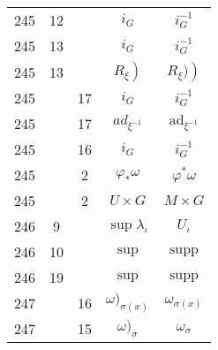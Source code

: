 \documentclass[a4paper,11pt]{article}
\newcommand{\mr}{\mathrm}
\newcommand{\ti}{\times}
\newcommand{\ad}{\mr{ad}}
\newcommand{\supp}{\mr{supp}}
\newcommand{\vp}{\varphi}
\newcommand{\io}{\iota}
\newcommand{\la}{\lambda}
\newcommand{\om}{\omega}
\newcommand{\s}{\sigma}
\begin{document}
\begin{center}
\begin{tabular}{|c|c|c|c|c|}
    245 & 12 & & $i_{ G }$ & $i_{ G }^{ -1 }$ \\
    245 & 13 & & $i_{ G }$ & $i_{ G }^{ -1 }$ \\
    245 & 13 & & $\left. R_{ \xi } \right)$ & $\left. R_{ \xi } ) \right)$ \\
    245 & & 17 & $i_{ G }$ & $i_{ G }^{ -1 }$ \\
    245 & & 17 & $ad_{ \xi^{ -1 } }$ & $\ad_{ \xi^{ -1 } }$ \\
    245 & & 16 & $i_{ G }$ & $i_{ G }^{ -1 }$ \\
    245 & &  2 & $\vp_{ * } \om$ & $\vp^{ * } \om$ \\
    245 & &  2 & $U \ti G$ & $M \ti G$ \\
    246 &  9 & & $\sup \la_{ \io }$ & $U_{ \io }$ \\
    246 & 10 & & $\sup$ & $\supp$ \\
    246 & 19 & & $\sup$ & $\supp$ \\
    247 & & 16 & $\om )_{ \s( x ) }$ & $\om_{ \s( x ) }$ \\
    247 & & 15 & $\om )_{ \s }$ & $\om_{ \s }$ \\ \hline
  \end{tabular}


\end{center}
\end{document}
